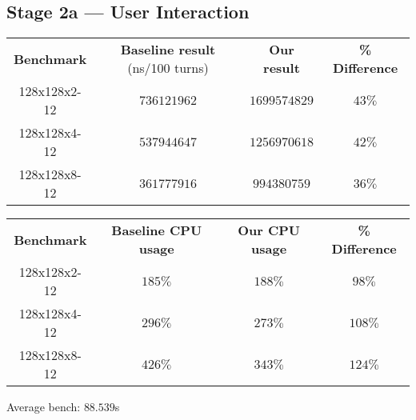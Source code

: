 \documentclass[11pt,a4paper,dvipsnames,cmyk]{scrartcl}
\begin{document}
\subsection*{Stage 2a --- User Interaction}%
\label{sub:user-interaction}
\begin{center}
    \begin{tabular}{|c|c|c|c|}
        \hline
        \textbf{Benchmark} & \textbf{Baseline result} (ns/100 turns) &
        \textbf{Our result} & \textbf{\% Difference} \\ \hhline{|=|=|=|=|}
        128x128x2-12 & $736121962$ & $1699574829$ & $43\%$ \\ \hline
        128x128x4-12 & $537944647$ & $1256970618$ & $42\%$ \\ \hline
        128x128x8-12 & $361777916$ & $994380759$ & $36\%$ \\ \hline
    \end{tabular}
\end{center}
\begin{center}
    \begin{tabular}{|c|c|c|c|}
        \hline
        \textbf{Benchmark} & \textbf{Baseline CPU usage} &
        \textbf{Our CPU usage} & \textbf{\% Difference} \\ \hhline{|=|=|=|=|}
        128x128x2-12 & $185\%$ & $188\%$ & $98\%$ \\ \hline
        128x128x4-12 & $296\%$ & $273\%$ & $108\%$ \\ \hline
        128x128x8-12 & $426\%$ & $343\%$ & $124\%$ \\ \hline
    \end{tabular}
\end{center}

Average bench: $88.539$s
\end{document}
